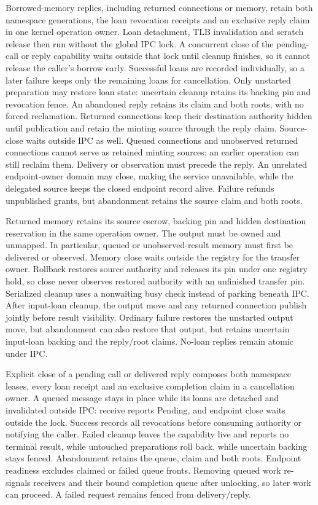 Borrowed-memory replies, including returned connections or memory, retain both
namespace generations, the loan revocation receipts
and an exclusive reply claim in one kernel operation owner. Loan detachment,
TLB invalidation and scratch release then run without the global IPC lock.
A concurrent close of the pending-call or reply capability waits outside that
lock until cleanup finishes, so it cannot release the caller's borrow early.
Successful loans are recorded individually, so a later failure keeps only the
remaining loans for cancellation. Only unstarted preparation may restore loan
state: uncertain cleanup retains its backing pin and revocation fence. An
abandoned reply retains its claim and both roots, with no forced reclamation.
Returned connections keep their destination authority hidden until publication
and retain the minting source through the reply claim. Source-close waits
outside IPC as well. Queued connections and unobserved returned connections
cannot serve as retained minting sources: an earlier operation can still reclaim
them. Delivery or observation must precede the reply. An unrelated endpoint-owner
domain may close, making the service unavailable, while the delegated source
keeps the closed endpoint record alive. Failure refunds unpublished grants, but
abandonment retains the source claim and both roots.

Returned memory retains its source escrow, backing pin and hidden destination
reservation in the same operation owner. The output must be owned and unmapped. In particular,
queued or unobserved-result memory must first be delivered or observed. Memory
close waits outside the registry for the transfer owner. Rollback restores source
authority and releases its pin under one registry hold, so close never observes
restored authority with an unfinished transfer pin. Serialized cleanup uses a
nonwaiting busy check instead of parking beneath IPC. After input-loan cleanup,
the output move and any returned connection publish jointly before result
visibility. Ordinary failure restores the unstarted output move, but abandonment
can also restore that output, but retains uncertain input-loan backing and the
reply/root claims. No-loan replies remain atomic under IPC.

Explicit close of a pending call or delivered reply composes both namespace
leases, every loan receipt and an exclusive completion claim in a cancellation
owner. A queued message stays in place while its loans are detached and
invalidated outside IPC: receive reports Pending, and endpoint close waits
outside the lock. Success records all revocations before consuming authority
or notifying the caller. Failed cleanup leaves the capability live and reports
no terminal result, while untouched preparations roll back, while uncertain backing
stays fenced. Abandonment retains the queue, claim and both roots.
Endpoint readiness excludes claimed or failed queue fronts. Removing queued
work re-signals receivers and their bound completion queue after unlocking,
so later work can proceed. A failed request remains fenced from delivery/reply.

